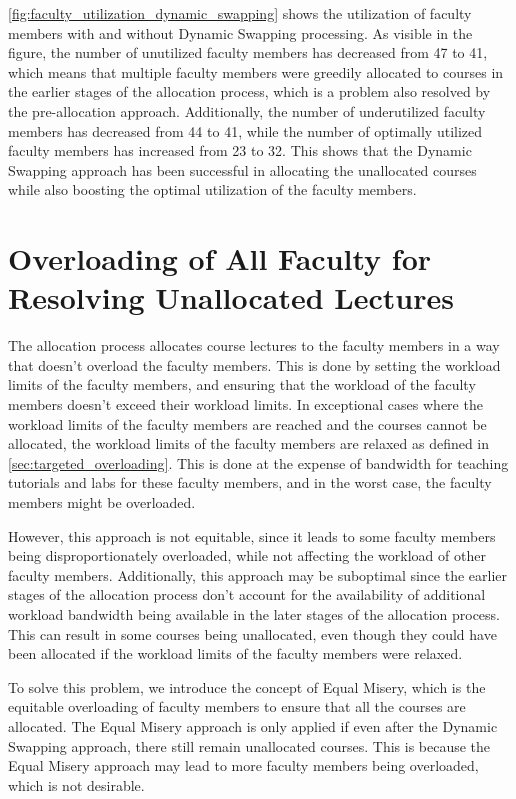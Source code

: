\autoref{fig:faculty_utilization_dynamic_swapping} shows the utilization of faculty members with and without Dynamic Swapping processing. As visible in the figure, the number of unutilized faculty members has decreased from 47 to 41, which means that multiple faculty members were greedily allocated to courses in the earlier stages of the allocation process, which is a problem also resolved by the pre-allocation approach. Additionally, the number of underutilized faculty members has decreased from 44 to 41, while the number of optimally utilized faculty members has increased from 23 to 32. This shows that the Dynamic Swapping approach has been successful in allocating the unallocated courses while also boosting the optimal utilization of the faculty members.


\section{Overloading of All Faculty for Resolving Unallocated Lectures}

The allocation process allocates course lectures to the faculty members in a way that doesn't overload the faculty members. This is done by setting the workload limits of the faculty members, and ensuring that the workload of the faculty members doesn't exceed their workload limits. In exceptional cases where the workload limits of the faculty members are reached and the courses cannot be allocated, the workload limits of the faculty members are relaxed as defined in \autoref{sec:targeted_overloading}. This is done at the expense of bandwidth for teaching tutorials and labs for these faculty members, and in the worst case, the faculty members might be overloaded.

However, this approach is not equitable, since it leads to some faculty members being disproportionately overloaded, while not affecting the workload of other faculty members. Additionally, this approach may be suboptimal since the earlier stages of the allocation process don't account for the availability of additional workload bandwidth being available in the later stages of the allocation process. This can result in some courses being unallocated, even though they could have been allocated if the workload limits of the faculty members were relaxed.

To solve this problem, we introduce the concept of Equal Misery, which is the equitable overloading of faculty members to ensure that all the courses are allocated. The Equal Misery approach is only applied if even after the Dynamic Swapping approach, there still remain unallocated courses. This is because the Equal Misery approach may lead to more faculty members being overloaded, which is not desirable.

